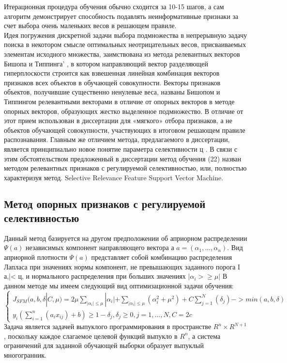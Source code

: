 \documentclass[../body.tex]{subfiles}
\begin{document}
{		Итерационная процедура обучения обычно сходится за 10-15 шагов, а сам алгоритм
		демонстрирует способность подавлять неинформативные признаки за счет выбора очень
		маленьких весов в решающем правиле.
		\\
		Идея погружения дискретной задачи выбора подмножества в непрерывную задачу поиска в некотором смысле оптимальных неотрицательных весов, присваиваемых элементам исходного множества, заимствована из метода релевантных векторов Бишопа и Типпинга' , в
		котором направляющий вектор разделяющей гиперплоскости строится как взвешенная линейная комбинация векторов признаков всех объектов в обучающей совокупности. Векторы
		признаков объектов, получившие существенно ненулевые веса, названы Бишопом и Типпингом релевантными векторами в отличие от опорных векторов в методе опорных векторов, образующих жестко выделенное подмножество. В отличие от этот прием использован в диссертации для «мягкого» отбора признаков, а не объектов обучающей совокупности,
		участвующих в итоговом решающем правиле распознавания. Главным же отличием метода,
		предлагаемого в диссертации, является принципиально новое понятие параметра селективности ц .
		В связи с этим обстоятельством предложенный в диссертации метод обучения (22)
		назван методом релевантных признаков с регулируемой селективностью, или, полностью
		характеризуя метод. Selective Relevance Feature Support Vector Machine.
		\subsection{Метод опорных признаков с регулируемой селективностью}
		Данный метод базируется на другом
		предположении об априорном распределении $\varPsi(a)$ независимых компонент направляющего вектора а $a=(\alpha_1, ..., \alpha_n)$. Вид априорной плотности $\varPsi(a)$ представляет собой комбинацию распределения Лапласа при значениях нормы компонент, не превышающих заданного
		порога I а,|< ц, и нормального распределения при больших значениях $|\alpha_{i}>\geq\mu|$ 
		В данном методе мы имеем следующий вид оптимизационной задачи обучения:
		$$\left\{\begin{matrix}
			J_{SFM}(a, b, \delta |C,\mu) = 2\mu\sum_{|\alpha_{i}|\leq\mu}|\alpha_{i}| + \sum_{|\alpha_{i}|\leq\mu}(\alpha_{i}^2 + \mu^2)+ C\sum_{j=1}^{N}(\delta_j)->min(a,b,\delta)
			\\
			y_i(\sum_{i=1}^{n}(a_ix_{ij})+b)\geq1-\delta_j, \delta_j \geq 0, j= 1,...,N, C=2c
		\end{matrix}\right.$$
		Задача является задачей выпуклого программирования в пространстве $R^n \times R^{N+1}$, поскольку каждое слагаемое целевой функций выпукло в $R^n$, а система ограничений для заданной обучающей выборки образует выпуклый многогранник.
		
}
\end{document}
